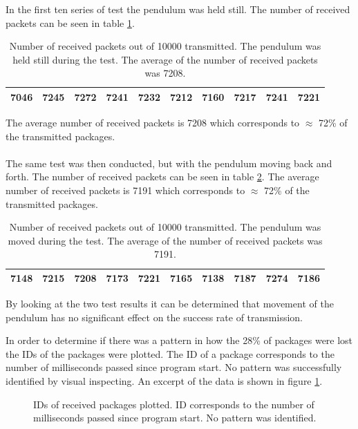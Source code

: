 {In the first ten series of test the pendulum was held still.
The number of received packets can be seen in table \ref{tab:received_still}.
\begin{table}[]
\centering
\begin{tabular}{|l|l|l|l|l|l|l|l|l|l|}
\hline
7046 & 7245 & 7272 & 7241 & 7232 & 7212 & 7160 & 7217 & 7241 & 7221 \\ \hline
\end{tabular}
\caption[Number of received packets without movement.]{Number of received packets out of 10000 transmitted. The pendulum was held still during the test. The average of the number of received packets was 7208.}
\label{tab:received_still}
\end{table}
The average number of received packets is 7208 which corresponds to $\approx$ 72\% of the transmitted packages.
\\~\\
The same test was then conducted, but with the pendulum moving back and forth.
The number of received packets can be seen in table \ref{tab:received_moved}.
The average number of received packets is 7191 which corresponds to $\approx$ 72\% of the transmitted packages.

\begin{table}[]
\centering
\begin{tabular}{|l|l|l|l|l|l|l|l|l|l|}
\hline
7148 & 7215 & 7208 & 7173 & 7221 & 7165 & 7138 & 7187 & 7274 & 7186 \\ \hline
\end{tabular}
\caption[Number of received packets with movement.]{Number of received packets out of 10000 transmitted. The pendulum was moved during the test. The average of the number of received packets was 7191.}
\label{tab:received_moved}
\end{table}
By looking at the two test results it can be determined that movement of the pendulum has no significant effect on the success rate of transmission.

In order to determine if there was a pattern in how the 28\% of packages were lost the IDs of the packages were plotted.
The ID of a package corresponds to the number of milliseconds passed since program start.
No pattern was successfully identified by visual inspecting.
An excerpt of the data is shown in figure \ref{fig:received_packets}.

\begin{figure}[h]
	\centering
	\caption[IDs of received packages plotted.]{IDs of received packages plotted. ID corresponds to the number of milliseconds passed since program start. No pattern was identified.}
	\label{fig:received_packets}
\end{figure}

}

